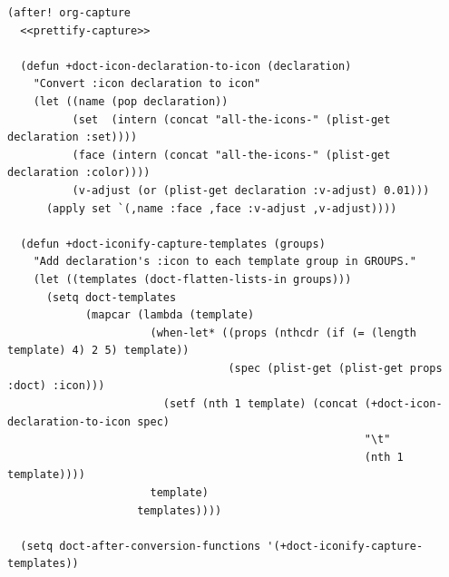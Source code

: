 \documentclass[11pt]{article}
\begin{document}
\begin{verbatim}
(after! org-capture
  <<prettify-capture>>

  (defun +doct-icon-declaration-to-icon (declaration)
    "Convert :icon declaration to icon"
    (let ((name (pop declaration))
          (set  (intern (concat "all-the-icons-" (plist-get declaration :set))))
          (face (intern (concat "all-the-icons-" (plist-get declaration :color))))
          (v-adjust (or (plist-get declaration :v-adjust) 0.01)))
      (apply set `(,name :face ,face :v-adjust ,v-adjust))))

  (defun +doct-iconify-capture-templates (groups)
    "Add declaration's :icon to each template group in GROUPS."
    (let ((templates (doct-flatten-lists-in groups)))
      (setq doct-templates
            (mapcar (lambda (template)
                      (when-let* ((props (nthcdr (if (= (length template) 4) 2 5) template))
                                  (spec (plist-get (plist-get props :doct) :icon)))
                        (setf (nth 1 template) (concat (+doct-icon-declaration-to-icon spec)
                                                       "\t"
                                                       (nth 1 template))))
                      template)
                    templates))))

  (setq doct-after-conversion-functions '(+doct-iconify-capture-templates))


\end{verbatim}
\end{document}
